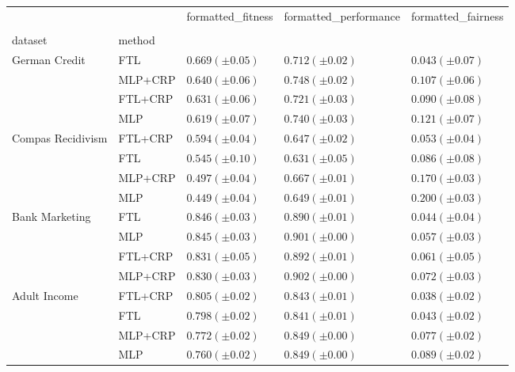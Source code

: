 \begin{tabular}{lllll}
\toprule
 &  & formatted_fitness & formatted_performance & formatted_fairness \\
 &  &  &  &  \\
dataset & method &  &  &  \\
\midrule
\multirow[t]{4}{*}{German Credit} & FTL & $0.669 (\pm0.05)$ & $0.712 (\pm0.02)$ & $0.043 (\pm0.07)$ \\
 & MLP+CRP & $0.640 (\pm0.06)$ & $0.748 (\pm0.02)$ & $0.107 (\pm0.06)$ \\
 & FTL+CRP & $0.631 (\pm0.06)$ & $0.721 (\pm0.03)$ & $0.090 (\pm0.08)$ \\
 & MLP & $0.619 (\pm0.07)$ & $0.740 (\pm0.03)$ & $0.121 (\pm0.07)$ \\
\cline{1-5}
\multirow[t]{4}{*}{Compas Recidivism} & FTL+CRP & $0.594 (\pm0.04)$ & $0.647 (\pm0.02)$ & $0.053 (\pm0.04)$ \\
 & FTL & $0.545 (\pm0.10)$ & $0.631 (\pm0.05)$ & $0.086 (\pm0.08)$ \\
 & MLP+CRP & $0.497 (\pm0.04)$ & $0.667 (\pm0.01)$ & $0.170 (\pm0.03)$ \\
 & MLP & $0.449 (\pm0.04)$ & $0.649 (\pm0.01)$ & $0.200 (\pm0.03)$ \\
\cline{1-5}
\multirow[t]{4}{*}{Bank Marketing} & FTL & $0.846 (\pm0.03)$ & $0.890 (\pm0.01)$ & $0.044 (\pm0.04)$ \\
 & MLP & $0.845 (\pm0.03)$ & $0.901 (\pm0.00)$ & $0.057 (\pm0.03)$ \\
 & FTL+CRP & $0.831 (\pm0.05)$ & $0.892 (\pm0.01)$ & $0.061 (\pm0.05)$ \\
 & MLP+CRP & $0.830 (\pm0.03)$ & $0.902 (\pm0.00)$ & $0.072 (\pm0.03)$ \\
\cline{1-5}
\multirow[t]{4}{*}{Adult Income} & FTL+CRP & $0.805 (\pm0.02)$ & $0.843 (\pm0.01)$ & $0.038 (\pm0.02)$ \\
 & FTL & $0.798 (\pm0.02)$ & $0.841 (\pm0.01)$ & $0.043 (\pm0.02)$ \\
 & MLP+CRP & $0.772 (\pm0.02)$ & $0.849 (\pm0.00)$ & $0.077 (\pm0.02)$ \\
 & MLP & $0.760 (\pm0.02)$ & $0.849 (\pm0.00)$ & $0.089 (\pm0.02)$ \\
\cline{1-5}
\bottomrule
\end{tabular}
